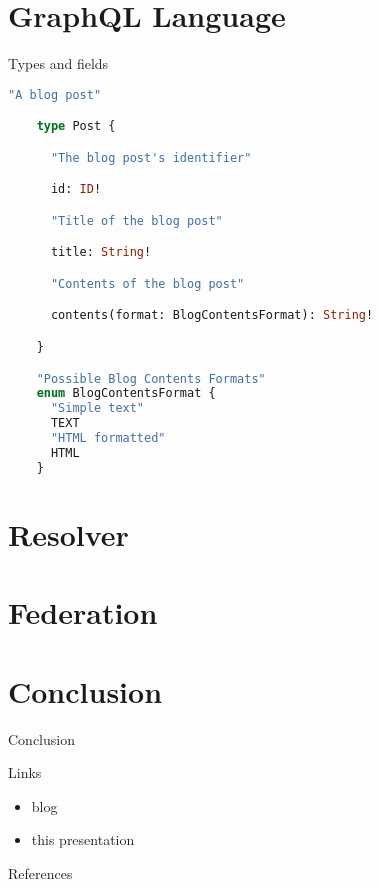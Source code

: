 \documentclass[notes]{beamer}
\begin{document}
\section{GraphQL Language}
\begin{frame}{Types and fields}
  \begin{lstlisting}[language=GraphQL]
    "A blog post"

    type Post {

      "The blog post's identifier"

      id: ID!

      "Title of the blog post"

      title: String!

      "Contents of the blog post"

      contents(format: BlogContentsFormat): String!

    }

    "Possible Blog Contents Formats"
    enum BlogContentsFormat {
      "Simple text"
      TEXT
      "HTML formatted"
      HTML
    }
  \end{lstlisting}
\end{frame}


\section{Resolver}
\section{Federation}
\section{Conclusion}
\begin{frame}{Conclusion}
\end{frame}

\begin{frame}{Links}
  \begin{itemize}
  \item blog
  \item this presentation
  \end{itemize}
\end{frame}

\begin{frame}{References}
  \printbibliography{}
\end{frame}
\end{document}
